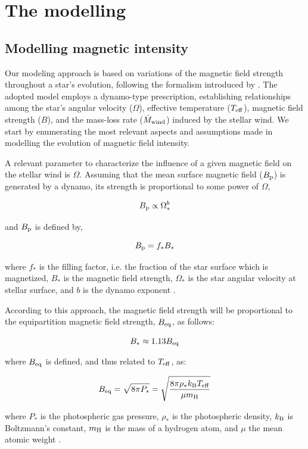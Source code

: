 \documentclass[fleqn,usenatbib]{mnras}
\begin{document}
\section{The modelling} \label{modelling}
\subsection{Modelling magnetic intensity} \label{mod_mbi}
Our modeling approach is based on variations of the magnetic field strength throughout a star's evolution, following the formalism introduced by \citet{Gallet2013}. The adopted model employs a dynamo-type prescription, establishing relationships among the star's angular velocity ($\Omega$), effective temperature ($T_{\mathrm{eff}}$), magnetic field strength ($B$), and the mass-loss rate ($\Dot{M}_{\mathrm{wind}}$) induced by the stellar wind. We start by enumerating the most relevant aspects and assumptions made in modelling the evolution of magnetic field intensity. \par 

A relevant parameter to characterize the influence of a given magnetic field on the stellar wind is $\Omega$. Assuming that the mean surface magnetic field ($B_{\mathrm{p}}$) is generated by a dynamo, its strength is proportional to some power of $\Omega$,
\begin{ceqn}
\begin{equation}
    B_{\mathrm{p}} \propto \Omega_*^b \label{eq:mf_strenght}
\end{equation}
\end{ceqn}
and $B_{\mathrm{p}}$ is defined by,
\begin{ceqn}
\begin{equation}
    B_{\mathrm{p}} = f_*B_* \label{eq:bp}
\end{equation}
\end{ceqn}
where $f_*$ is the filling factor, i.e. the fraction of the star surface which is magnetized, $B_*$ is the magnetic field strength, $\Omega_*$ is the star angular velocity at stellar surface, and $b$ is the dynamo exponent \citep{Gallet2013}.\par

According to this approach, the magnetic field strength will be proportional to the equipartition magnetic field strength, $B_{\mathrm{eq}}$, as follows:
\begin{ceqn}
\begin{equation}
    B_* \approx 1.13 B_{\mathrm{eq}} \label{eq:mf_bstar}
\end{equation}
\end{ceqn}
where $B_{\mathrm{eq}}$ is defined, and thus related to $T_{\mathrm{eff}}$, as:
\begin{ceqn}
\begin{equation}
    B_{\mathrm{eq}} = \sqrt{8\pi P_*} = \sqrt{\frac{8\pi\rho_* k_{\mathrm{B}} T_{\mathrm{eff}}}{\mu m_{\mathrm{H}}}}\label{eq:mf_beq}    
\end{equation}
\end{ceqn}
where $P_*$ is the photospheric gas pressure, $\rho_*$ is the photospheric density, $k_{\mathrm{B}}$ is Boltzmann's constant, $m_{\mathrm{H}}$ is the mass of a hydrogen atom, and $\mu$ the mean atomic weight \citep{Cranmer2011}.
\end{document}
